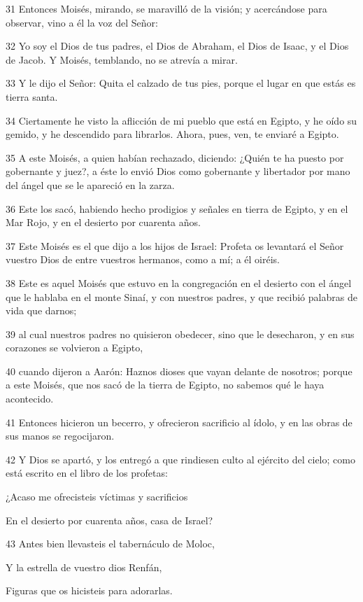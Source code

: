 \par 31 Entonces Moisés, mirando, se maravilló de la visión; y acercándose para observar, vino a él la voz del Señor:
\par 32 Yo soy el Dios de tus padres, el Dios de Abraham, el Dios de Isaac, y el Dios de Jacob. Y Moisés, temblando, no se atrevía a mirar.
\par 33 Y le dijo el Señor: Quita el calzado de tus pies, porque el lugar en que estás es tierra santa.
\par 34 Ciertamente he visto la aflicción de mi pueblo que está en Egipto, y he oído su gemido, y he descendido para librarlos. Ahora, pues, ven, te enviaré a Egipto.
\par 35 A este Moisés, a quien habían rechazado, diciendo: ¿Quién te ha puesto por gobernante y juez?, a éste lo envió Dios como gobernante y libertador por mano del ángel que se le apareció en la zarza.
\par 36 Este los sacó, habiendo hecho prodigios y señales en tierra de Egipto, y en el Mar Rojo, y en el desierto por cuarenta años.
\par 37 Este Moisés es el que dijo a los hijos de Israel: Profeta os levantará el Señor vuestro Dios de entre vuestros hermanos, como a mí; a él oiréis.
\par 38 Este es aquel Moisés que estuvo en la congregación en el desierto con el ángel que le hablaba en el monte Sinaí, y con nuestros padres, y que recibió palabras de vida que darnos;
\par 39 al cual nuestros padres no quisieron obedecer, sino que le desecharon, y en sus corazones se volvieron a Egipto,
\par 40 cuando dijeron a Aarón: Haznos dioses que vayan delante de nosotros; porque a este Moisés, que nos sacó de la tierra de Egipto, no sabemos qué le haya acontecido.
\par 41 Entonces hicieron un becerro, y ofrecieron sacrificio al ídolo, y en las obras de sus manos se regocijaron.
\par 42 Y Dios se apartó, y los entregó a que rindiesen culto al ejército del cielo; como está escrito en el libro de los profetas:
\par ¿Acaso me ofrecisteis víctimas y sacrificios
\par En el desierto por cuarenta años, casa de Israel?
\par 43 Antes bien llevasteis el tabernáculo de Moloc,
\par Y la estrella de vuestro dios Renfán,
\par Figuras que os hicisteis para adorarlas.
